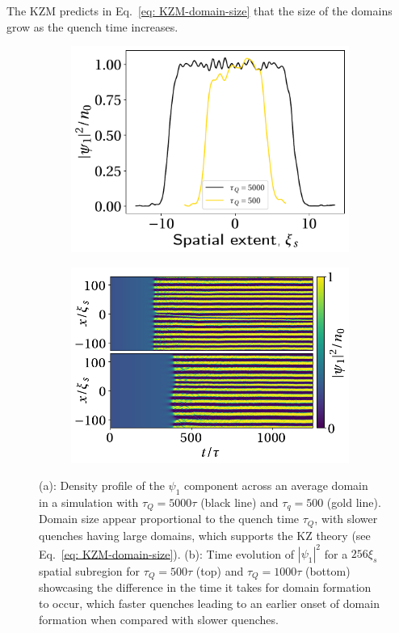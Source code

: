 The KZM predicts in Eq.~\eqref{eq: KZM-domain-size} that the size of the domains
grow as the quench time increases.
\begin{figure}[tb]
    \centering
    \begin{subfigure}{0.49\textwidth}
        \includegraphics[width=\textwidth]{gfx/ch-spin1/BA-FM_domain_width.pdf}
        \caption{\label{fig: BA-FM-domain-width-comparison}}
    \end{subfigure}
    \begin{subfigure}{0.49\textwidth}
        \includegraphics[width=\textwidth]{gfx/ch-spin1/BA-FM_domain_onset.png}
        \caption{\label{fig: BA-FM-domain-onset}}
    \end{subfigure}
    \caption[Density profile across an average FM domain]
    {(a): Density profile of the \(\psi_1\) component across an average
        domain in a simulation with \(\tau_Q=5000\tau \) (black line) and
        \(\tau_q=500\) (gold line).
        Domain size appear proportional to the quench time \(\tau_Q\), with
        slower quenches having large domains, which supports the KZ theory
        (see Eq.~\eqref{eq: KZM-domain-size}).
        (b): Time evolution of \( |\psi_1|^2\) for a \(256\xi_s\) spatial
        subregion for \( \tau_Q=500\tau \) (top) and \(\tau_Q=1000\tau \)
        (bottom) showcasing the difference in the time it takes for domain
        formation to occur, which faster quenches leading to an earlier onset
        of domain formation when compared with slower quenches.}
\end{figure}
